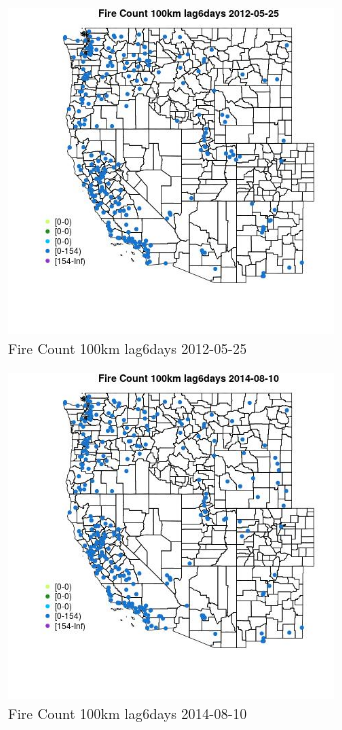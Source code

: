 \begin{figure} 
\centering  
\includegraphics[width=0.77\textwidth]{Code_Outputs/Report_ML_input_PM25_Step4_part_e_de_duplicated_aves_compiled_2019-05-18wNAs_MapObsFire_Count_100km_lag6days2012-05-25.jpg} 
\caption{\label{fig:Report_ML_input_PM25_Step4_part_e_de_duplicated_aves_compiled_2019-05-18wNAsMapObsFire_Count_100km_lag6days2012-05-25}Fire Count 100km lag6days 2012-05-25} 
\end{figure} 
 

\begin{figure} 
\centering  
\includegraphics[width=0.77\textwidth]{Code_Outputs/Report_ML_input_PM25_Step4_part_e_de_duplicated_aves_compiled_2019-05-18wNAs_MapObsFire_Count_100km_lag6days2014-08-10.jpg} 
\caption{\label{fig:Report_ML_input_PM25_Step4_part_e_de_duplicated_aves_compiled_2019-05-18wNAsMapObsFire_Count_100km_lag6days2014-08-10}Fire Count 100km lag6days 2014-08-10} 
\end{figure} 
 

